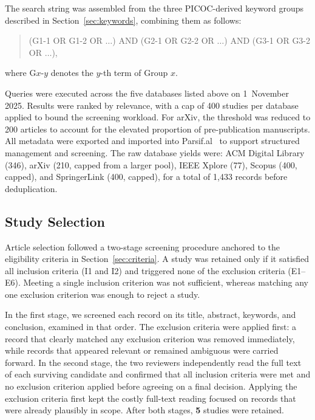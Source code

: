 The search string was assembled from the three PICOC-derived keyword groups described in Section~\ref{sec:keywords}, combining them as follows:

\begin{quote}
(G1-1 OR G1-2 OR $\ldots$) AND (G2-1 OR G2-2 OR $\ldots$) AND (G3-1 OR G3-2 OR $\ldots$),
\end{quote}

\noindent where G$x$-$y$ denotes the $y$-th term of Group $x$.

Queries were executed across the five databases listed above on 1~November 2025. Results were ranked by relevance, with a cap of 400 studies per database applied to bound the screening workload. For arXiv, the threshold was reduced to 200 articles to account for the elevated proportion of pre-publication manuscripts. All metadata were exported and imported into Parsif.al~\cite{parsifal} to support structured management and screening. The raw database yields were: ACM Digital Library (346), arXiv (210, capped from a larger pool), IEEE Xplore (77), Scopus (400, capped), and SpringerLink (400, capped), for a total of 1{,}433 records before deduplication.

\subsection{Study Selection}\label{sec:selection}
Article selection followed a two-stage screening procedure anchored to the eligibility criteria in Section~\ref{sec:criteria}. A study was retained only if it satisfied all inclusion criteria (I1 and I2) and triggered none of the exclusion criteria (E1--E6). Meeting a single inclusion criterion was not sufficient, whereas matching any one exclusion criterion was enough to reject a study.

In the first stage, we screened each record on its title, abstract, keywords, and conclusion, examined in that order. The exclusion criteria were applied first: a record that clearly matched any exclusion criterion was removed immediately, while records that appeared relevant or remained ambiguous were carried forward. In the second stage, the two reviewers independently read the full text of each surviving candidate and confirmed that all inclusion criteria were met and no exclusion criterion applied before agreeing on a final decision. Applying the exclusion criteria first kept the costly full-text reading focused on records that were already plausibly in scope. After both stages, \textbf{5} studies were retained.

